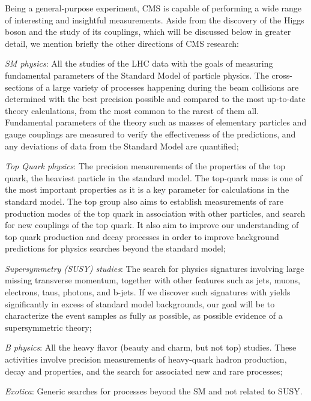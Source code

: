Being a general-purpose experiment, CMS is capable of performing a wide range of interesting and insightful measurements. Aside from the discovery of the Higgs boson and the study of its couplings, which will be discussed below in greater detail, we mention briefly the other directions of CMS research:

\begin{outline}
    \1 \emph{SM physics}: All the studies of the LHC data with the goals of measuring fundamental parameters of the Standard Model of particle physics. The cross-sections of a large variety of processes happening during the beam collisions are determined with the best precision possible and compared to the most up-to-date theory calculations, from the most common to the rarest of them all. Fundamental parameters of the theory such as masses of elementary particles and gauge couplings are measured to verify the effectiveness of the predictions, and any deviations of data from the Standard Model are quantified;
    
    \1 \emph{Top Quark physics}: The precision measurements of the properties of the top quark, the heaviest particle in the standard model. The top-quark mass is one of the most important properties as it is a key parameter for calculations in the standard model. The top group also aims to establish measurements of rare production modes of the top quark in association with other particles, and search for new couplings of the top quark. It also aim to improve our understanding of top quark production and decay processes in order to improve background predictions for physics searches beyond the standard model;
    
    \1 \emph{Supersymmetry (SUSY) studies}:  The search for physics signatures involving large missing transverse momentum, together with other features such as jets, muons, electrons, taus, photons, and b-jets. If we discover such signatures with yields significantly in excess of standard model backgrounds, our goal will be to characterize the event samples as fully as possible, as possible evidence of a supersymmetric theory;
    
    \1 \emph{B physics}: All the heavy flavor (beauty and charm, but not top) studies. These activities involve precision measurements of heavy-quark hadron production, decay and properties, and the search for associated new and rare processes;
    
    \1 \emph{Exotica}: Generic searches for processes beyond the SM and not related to SUSY.
\end{outline}

